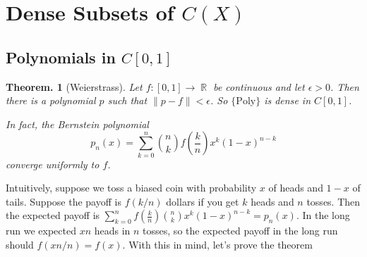 \documentclass[11pt, a4paper]{memoir}
\DeclareMathOperator{\R}{{\mathbb{R}}}
\newcommand{\norm}[1]{\ensuremath{\left\lVert#1\right\rVert}}
\theoremstyle{change}
\newtheorem{theorem}{Theorem.}[section]
\theoremstyle{plain}
\theoremstyle{nonumberplain}
\numberwithin{equation}{section}
\begin{document}
\section{Dense Subsets of $C(X)$}
\subsection{Polynomials in $C[0,1]$}
\begin{theorem}[Weierstrass]
    Let $f:[0,1]\to\R$ be continuous and let $\epsilon>0$.
    Then there is a polynomial $p$ such that $\norm{p-f}<\epsilon$. So $\{\text{Poly}\}$ is dense in $C[0,1]$.

    In fact, the Bernstein polynomial
    \[p_n(x)=\sum\limits_{k=0}^n\binom{n}{k}f\left(\frac{k}{n}\right)x^k(1-x)^{n-k}\]
    converge uniformly to $f$.
\end{theorem}
Intuitively, suppose we toss a biased coin with probability $x$ of heads and $1-x$ of tails.
Suppose the payoff is $f(k/n)$ dollars if you get $k$ heads and $n$ tosses.
Then the expected payoff is $\sum\limits_{k=0}^nf\left(\frac{k}{n}\right)\binom{n}{k}x^k(1-x)^{n-k}=p_n(x)$.
In the long run we expected $xn$ heads in $n$ tosses, so the expected payoff in the long run should $f(xn/n)=f(x)$.
With this in mind, let's prove the theorem
\end{document}
